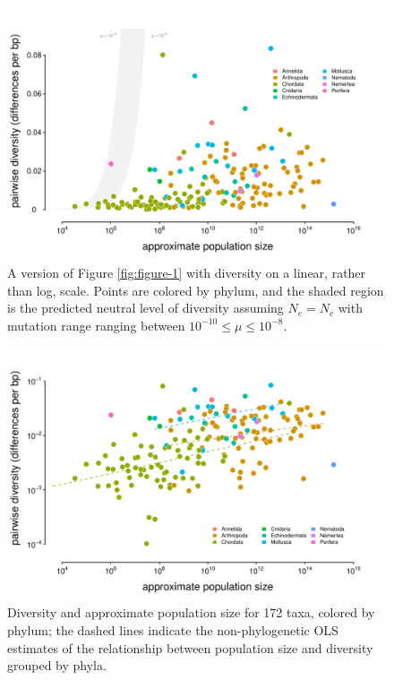 \documentclass[11pt]{article}
\begin{document}
\begin{figure}[!htb]
  \centering
  \includegraphics[width=\textwidth]{figures/diversity_popsize_linear.pdf}

  \caption{A version of Figure \ref{fig:figure-1} with diversity on a linear,
    rather than log, scale. Points are colored by phylum, and the shaded region
    is the predicted neutral level of diversity assuming $N_e = N_c$ with mutation
  range ranging between $10^{-10} \le \mu \le 10^{-8}$. }

  \label{suppfig:figure-1-linear}
\end{figure}

\begin{figure}[!htb]
  \centering
  \includegraphics[width=\textwidth]{figures/diversity_popsize_averages.pdf}

  \caption{Diversity and approximate population size for 172 taxa, colored by
    phylum; the dashed lines indicate the non-phylogenetic OLS estimates of the
  relationship between population size and diversity grouped by phyla.}

  \label{suppfig:figure-1-ave}
\end{figure}
\end{document}
